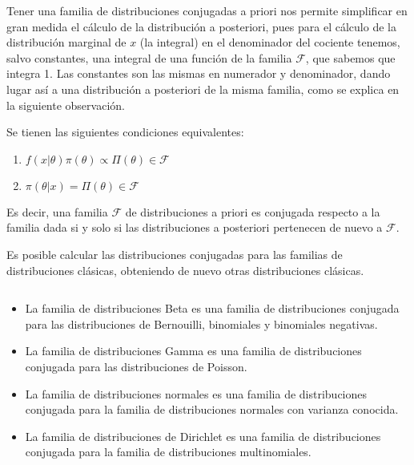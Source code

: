 \documentclass{article}
\begin{document}
Tener una familia de distribuciones conjugadas a priori nos permite simplificar en gran medida el cálculo de la distribución a posteriori, pues para el cálculo de la distribución marginal de $x$ (la integral) en el denominador del cociente tenemos, salvo constantes, una integral de una función de la familia $\mathcal{F}$, que sabemos que integra 1. Las constantes son las mismas en numerador y denominador, dando lugar así a una distribución a posteriori de la misma familia, como se explica en la siguiente observación.

\begin{remark}
	Se tienen las siguientes condiciones equivalentes:
	\begin{enumerate}%
		\item $f(x|\theta)\pi(\theta) \propto \Pi(\theta) \in \mathcal{F}$
		\item $\pi(\theta|x)=\Pi(\theta)\in\mathcal{F}$
	\end{enumerate}
	Es decir, una familia $\mathcal{F}$ de distribuciones a priori es conjugada respecto a la familia dada si y solo si las distribuciones a posteriori pertenecen de nuevo a $\mathcal{F}$.
\end{remark}

Es posible calcular las distribuciones conjugadas para las familias de distribuciones clásicas, obteniendo de nuevo otras distribuciones clásicas.

\begin{prop}
	$ $ \newline
	\begin{itemize}
		\item La familia de distribuciones Beta es una familia de distribuciones conjugada para las distribuciones de Bernouilli, binomiales y binomiales negativas.

		\item La familia de distribuciones Gamma es una familia de distribuciones conjugada para las distribuciones de Poisson.%

		\item La familia de distribuciones normales es una familia de distribuciones conjugada para la familia de distribuciones normales con varianza conocida.

		\item La familia de distribuciones de Dirichlet es una familia de distribuciones conjugada para la familia de distribuciones multinomiales.
	\end{itemize}
\end{prop}
\end{document}
